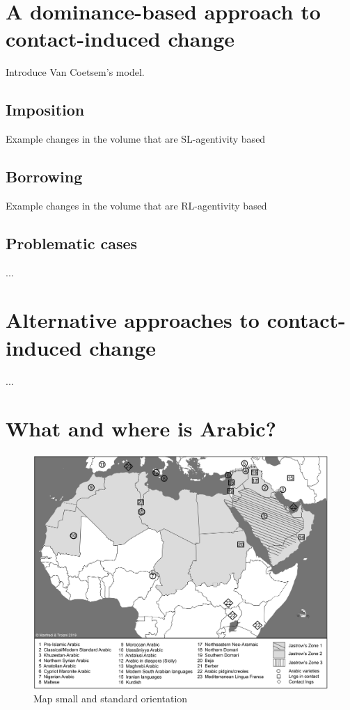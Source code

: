 \documentclass[output=paper]{langsci/langscibook}
\begin{document}
\section{A dominance-based approach to contact-induced change}\label{introvc}
Introduce Van Coetsem's model.

\subsection{Imposition}
Example changes in the volume that are SL-agentivity based

\subsection{Borrowing}
Example changes in the volume that are RL-agentivity based

\subsection{Problematic cases}
...

\section{Alternative approaches to contact-induced change}\label{introotherapproaches} 
...

\section{What and where is Arabic?}

\begin{figure}
\includegraphics[width=\textwidth]{figures/Monde_arabe.jpg}
\caption{Map small and standard orientation}
\label{intromap}
\end{figure}
\end{document}
